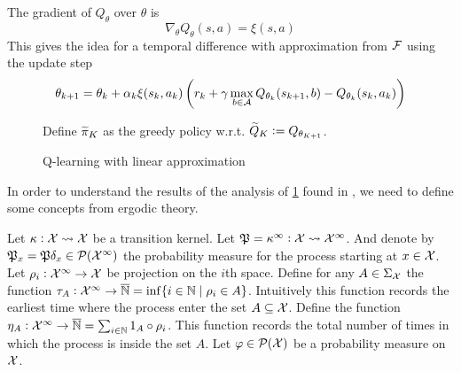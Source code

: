 The gradient of $Q_\theta$ over $\theta$ is
\[ \nabla_\theta Q_\theta(s, a) = \xi(s, a) \]
This gives the idea for a temporal difference with approximation from
$\mathcal{F}$ using the update step
\[ \theta_{k+1} = \theta_k + \alpha_k \xi(s_k, a_k)
  \left( r_k + \gamma \max_{b \in \mathcal{A}} Q_{\theta_k}(s_{k+1}, b)
- Q_{\theta_k}(s_k, a_k) \right) \]

\begin{figure}[H]
\begin{algorithm}[H] %
  \caption{Q-learning with linear approximation}

  Define $\widetilde{\pi}_K$ as the greedy policy w.r.t.
  $\widetilde{Q}_K \vcentcolon= Q_{\theta_{K+1}}$.

  \label{alg:QLlinear}
\end{algorithm}
\end{figure}

In order to understand the results of the analysis of \cref{alg:QLlinear}
found in ,
we need to define some concepts from ergodic theory.

Let $\kappa : \mathcal{X} \leadsto \mathcal{X}$ be a transition kernel.
Let $\mathfrak{P} = \kappa^\infty : \mathcal{X} \leadsto \mathcal{X}^\infty$.
And denote by
$\mathfrak{P}_x = \mathfrak{P}\delta_x \in \mathcal{P}(\mathcal{X}^\infty)$
the probability measure for the process starting at $x \in \mathcal{X}$.
Let $\rho_i : \mathcal{X}^\infty \to \mathcal{X}$ be projection on the
$i$th space.
Define for any $A \in \Sigma_{\mathcal{X}}$ the function
$\tau_A : \mathcal{X}^\infty \to \overline{\mathbb{N}} = \inf\{ i \in \mathbb{N} \mid \rho_i \in A \}$.
Intuitively this function records the earliest time where the process
enter the set $A \subseteq \mathcal{X}$.
Define the function
$\eta_A : \mathcal{X}^\infty \to \overline{\mathbb{N}} = \sum_{i \in \mathbb{N}} 1_A \circ \rho_i$.
This function records the total number of times in which the process is
inside the set $A$.
Let $\varphi \in \mathcal{P}(\mathcal{X})$ be a probability measure on $\mathcal{X}$.

